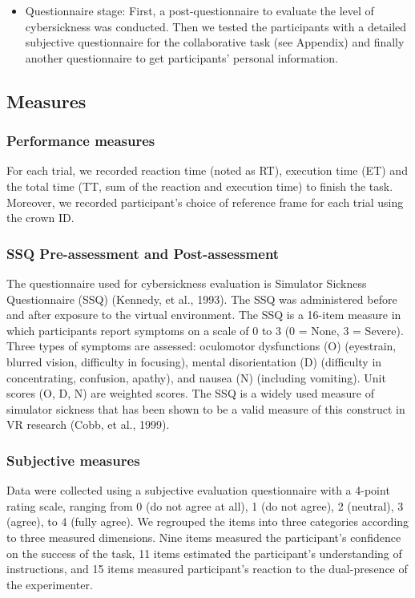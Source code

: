\begin{itemize}
\item Questionnaire stage: First, a post-questionnaire to evaluate the level of cybersickness was conducted. Then we tested the participants with a detailed subjective questionnaire for the collaborative task (see Appendix) and finally another questionnaire to get participants' personal information.
\end{itemize}


\subsection{Measures}
\subsubsection{Performance measures}
For each trial, we recorded reaction time (noted as RT), execution time (ET) and the total time (TT, sum of the reaction and execution time) to finish the task. Moreover, we recorded participant's choice of reference frame for each trial using the crown ID.

\subsubsection{SSQ Pre-assessment and Post-assessment}
The questionnaire used for cybersickness evaluation is Simulator Sickness Questionnaire (SSQ) (Kennedy, et al., 1993). The SSQ was administered before and after exposure to the virtual environment. The SSQ is a 16-item measure in which participants report symptoms on a scale of 0 to 3 (0 = None, 3 = Severe). Three types of symptoms are assessed: oculomotor dysfunctions (O) (eyestrain, blurred vision, difficulty in focusing), mental disorientation (D) (difficulty in concentrating, confusion, apathy), and nausea (N) (including vomiting). Unit scores (O, D, N) are weighted scores. The SSQ is a widely used measure of simulator sickness that has been shown to be a valid measure of this construct in VR research (Cobb, et al., 1999).

\subsubsection{Subjective measures}
Data were collected using a subjective evaluation questionnaire with a 4-point rating scale, ranging from 0 (do not agree at all), 1 (do not agree), 2 (neutral), 3 (agree), to 4 (fully agree). We regrouped the items into three categories according to three measured dimensions. Nine items measured the participant's confidence on the success of the task, 11 items estimated the participant's understanding of instructions, and 15 items measured participant's reaction to the dual-presence of the experimenter.

